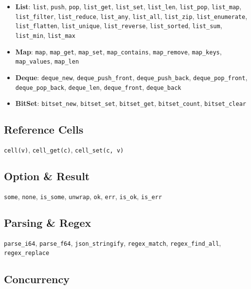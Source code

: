 \documentclass[
  english,
]{book}
\providecommand{\tightlist}{%
  \setlength{\itemsep}{0pt}\setlength{\parskip}{0pt}}
\begin{document}
\begin{itemize}
\tightlist
\item
  \textbf{List}: \texttt{list}, \texttt{push}, \texttt{pop},
  \texttt{list\_get}, \texttt{list\_set}, \texttt{list\_len},
  \texttt{list\_pop}, \texttt{list\_map}, \texttt{list\_filter},
  \texttt{list\_reduce}, \texttt{list\_any}, \texttt{list\_all},
  \texttt{list\_zip}, \texttt{list\_enumerate}, \texttt{list\_flatten},
  \texttt{list\_unique}, \texttt{list\_reverse}, \texttt{list\_sorted},
  \texttt{list\_sum}, \texttt{list\_min}, \texttt{list\_max}
\item
  \textbf{Map}: \texttt{map}, \texttt{map\_get}, \texttt{map\_set},
  \texttt{map\_contains}, \texttt{map\_remove}, \texttt{map\_keys},
  \texttt{map\_values}, \texttt{map\_len}
\item
  \textbf{Deque}: \texttt{deque\_new}, \texttt{deque\_push\_front},
  \texttt{deque\_push\_back}, \texttt{deque\_pop\_front},
  \texttt{deque\_pop\_back}, \texttt{deque\_len}, \texttt{deque\_front},
  \texttt{deque\_back}
\item
  \textbf{BitSet}: \texttt{bitset\_new}, \texttt{bitset\_set},
  \texttt{bitset\_get}, \texttt{bitset\_count}, \texttt{bitset\_clear}
\end{itemize}

\subsection{Reference Cells}\label{reference-cells}

\texttt{cell(v)}, \texttt{cell\_get(c)}, \texttt{cell\_set(c,\ v)}

\subsection{Option \& Result}\label{option-result}

\texttt{some}, \texttt{none}, \texttt{is\_some}, \texttt{unwrap},
\texttt{ok}, \texttt{err}, \texttt{is\_ok}, \texttt{is\_err}

\subsection{Parsing \& Regex}\label{parsing-regex}

\texttt{parse\_i64}, \texttt{parse\_f64}, \texttt{json\_stringify},
\texttt{regex\_match}, \texttt{regex\_find\_all},
\texttt{regex\_replace}

\subsection{Concurrency}\label{concurrency}
\end{document}
